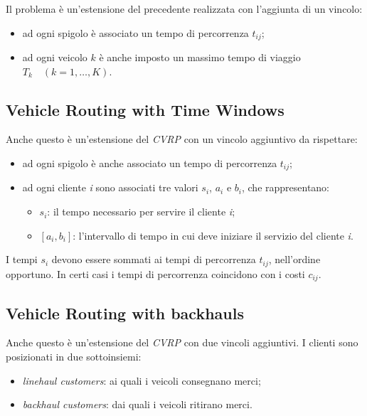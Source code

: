 \documentclass[11pt]{book}
\begin{document}
Il problema \`e un'estensione del precedente realizzata con l'aggiunta
di un vincolo:

\begin{itemize}
\item ad ogni spigolo \`e associato un tempo di percorrenza $t_{ij}$;
\item ad ogni veicolo $k$ \`e anche imposto un massimo tempo di
  viaggio $T_k\quad (k=1,\dots,K)$.
\end{itemize}


\subsection{Vehicle Routing with Time Windows}

Anche questo \`e un'estensione del {\em CVRP} con un vincolo
aggiuntivo da rispettare:

\begin{itemize}
\item ad ogni spigolo \`e anche associato un tempo di percorrenza
  $t_{ij}$;
\item ad ogni cliente {\em i} sono associati tre valori $s_i$, $a_i$ e
  $b_i$, che rappresentano:

  \begin{itemize}
  \item $s_i$: il tempo necessario per servire il cliente {\em i};
  \item $[a_i,b_i]$: l'intervallo di tempo in cui deve iniziare il
    servizio del cliente {\em i}.
  \end{itemize}

\end{itemize}

I tempi $s_i$ devono essere sommati ai tempi di percorrenza
$t_{ij}$, nell'ordine opportuno. In certi casi i tempi di percorrenza
coincidono con i costi $c_{ij}$.

\subsection{Vehicle Routing with backhauls}

Anche questo \`e un'estensione del {\em CVRP} con due vincoli
aggiuntivi. I clienti sono posizionati in due sottoinsiemi:

\begin{itemize}
\item {\em linehaul customers}: ai quali i veicoli consegnano merci;
\item {\em backhaul customers}: dai quali i veicoli ritirano merci.
\end{itemize}
\end{document}
